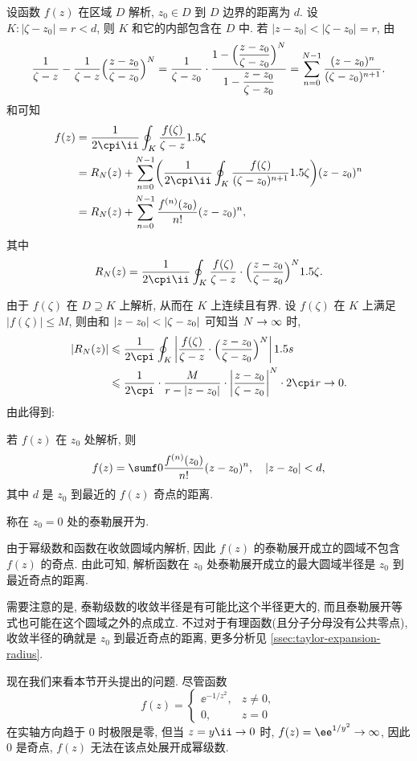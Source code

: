 设函数 $f(z)$ 在区域 $D$ 解析, $z_0\in D$ 到 $D$ 边界的距离为 $d$.
设 $K:|\zeta-z_0|=r<d$, 则 $K$ 和它的内部包含在 $D$ 中.
若 $|z-z_0|<|\zeta-z_0|=r$, 由
\[
   \frac1{\zeta-z}-\frac1{\zeta-z}\Bigl(\frac{z-z_0}{\zeta-z_0}\Bigr)^N
  =\frac1{\zeta-z_0}\cdot\frac{1-\Bigl(\dfrac{z-z_0}{\zeta-z_0}\Bigr)^N}{1-\dfrac{z-z_0}{\zeta-z_0}}
  =\sum_{n=0}^{N-1}\frac{(z-z_0)^n}{(\zeta-z_0)^{n+1}}.
\]
和\thmCIH 可知
\begin{align*}
   f(z)&
  =\frac1{2\cpi\ii}\oint_K \frac{f(\zeta)}{\zeta-z}\d\zeta\\&
  =R_N(z)+\sum_{n=0}^{N-1}\biggl(\frac1{2\cpi\ii}\oint_K
      \frac{f(\zeta)}{(\zeta-z_0)^{n+1}}\d\zeta
    \biggr)(z-z_0)^n\\&
  =R_N(z)+\sum_{n=0}^{N-1}\frac{f^{(n)}(z_0)}{n!}(z-z_0)^n,
\end{align*}
其中
\[
   R_N(z)
  =\frac1{2\cpi\ii}\oint_K\frac{f(\zeta)}{\zeta-z}\cdot\Bigl(\frac{z-z_0}{\zeta-z_0}\Bigr)^N\d\zeta.
\]

由于 $f(\zeta)$ 在 $D\supseteq K$ 上解析, 从而在 $K$ 上连续且有界.
设 $f(\zeta)$ 在 $K$ 上满足 $|f(\zeta)|\le M$,
则由\thmGrowUp 和 $\left|z-z_0\right|<\left|\zeta-z_0\right|$ 可知当 $N\rightarrow\infty$ 时,
\begin{align*}
   |R_N(z)|&
  \le\frac 1{2\cpi}\oint_K\abs{\frac{f(\zeta)}{\zeta-z}\cdot\Bigl(\frac{z-z_0}{\zeta-z_0}\Bigr)^N}\d s\\&
  \le\frac 1{2\cpi}\cdot \frac M{r-|z-z_0|}\cdot\abs{\frac{z-z_0}{\zeta-z_0}}^N\cdot 2\cpi r\ra 0.
\end{align*}
由此得到:

\begin{theorem}
  若 $f(z)$ 在 $z_0$ 处解析, 则
  \[
    f(z)=\sumf0 \frac{f^{(n)}(z_0)}{n!}(z-z_0)^n,
      \quad |z-z_0|<d,
  \]
  其中 $d$ 是 $z_0$ 到最近的 $f(z)$ 奇点的距离.
\end{theorem}

称在 $z_0=0$ 处的泰勒展开为.

由于幂级数和函数在收敛圆域内解析, 因此 $f(z)$ 的泰勒展开成立的圆域不包含 $f(z)$ 的奇点.
由此可知, 解析函数在 $z_0$ 处\alert{泰勒展开成立的最大圆域半径是 $z_0$ 到最近奇点的距离}.

需要注意的是, 泰勒级数的收敛半径是有可能比这个半径更大的,
而且泰勒展开等式也可能在这个圆域之外的点成立.
不过对于有理函数(且分子分母没有公共零点), 收敛半径的确就是 $z_0$ 到最近奇点的距离, 更多分析见 \ref{ssec:taylor-expansion-radius}.

现在我们来看本节开头提出的问题. 尽管函数
\[
  f(z)=\begin{cases}
    \ee^{-1/z^2},&z\neq 0,\\
    0,&z=0
  \end{cases}
\]
在实轴方向趋于 $0$ 时极限是零, 但当 $z=y\ii\ra0$ 时, $f(z)=\ee^{1/y^2}\ra\infty$, 因此 $0$ 是奇点, $f(z)$ 无法在该点处展开成幂级数.

